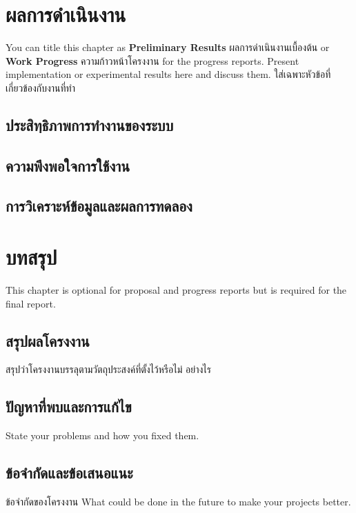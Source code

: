 \documentclass[12pt,oneside,openright,a4paper]{cpe-thai-project}
\begin{document}
\chapter{ผลการดำเนินงาน}

You can title this chapter as \textbf{Preliminary Results} ผลการดำเนินงานเบื้องต้น or \textbf{Work Progress} ความก้าวหน้าโครงงาน for the progress reports. Present implementation or experimental results here and discuss them.
ใส่เฉพาะหัวข้อที่เกี่ยวข้องกับงานที่ทำ 

\section{ประสิทฺธิภาพการทำงานของระบบ} 
\section{ความพึงพอใจการใช้งาน}
\section{การวิเคราะห์ข้อมูลและผลการทดลอง}

\chapter{บทสรุป}

This chapter is optional for proposal and progress reports but 
is required for the final report.

\section{สรุปผลโครงงาน}
สรุปว่าโครงงานบรรลุตามวัตถุประสงค์ที่ตั้งไว้หรือไม่ อย่างไร 

\section{ปัญหาที่พบและการแก้ไข}
State your problems and how you fixed them.

\section{ข้อจำกัดและข้อเสนอแนะ}
ข้อจำกัดของโครงงาน What could be done in the future to make your projects better.

\end{document}
